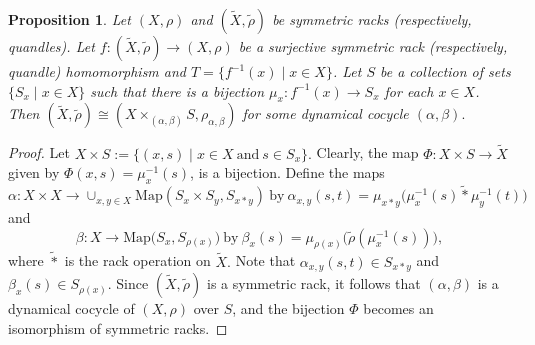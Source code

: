 \documentclass[11pt,reqno]{amsart}
\newtheorem{proposition}[theorem]{Proposition}
\theoremstyle{definition}
\numberwithin{equation}{subsection}
\newcommand{\Map}{\mathrm{Map}}
\begin{document}
\begin{proposition}\label{surjective homomorphism characterisation}
	Let $(X,\rho)$ and $(\tilde{X},\tilde{\rho})$ be symmetric racks (respectively, quandles). Let $f:(\tilde{X},\tilde{\rho}) \rightarrow (X,\rho)$ be a surjective symmetric rack (respectively, quandle) homomorphism and $T=\{f^{-1}(x) \mid x \in X\}$. Let $S$ be a collection of sets $\{ S_x \mid x \in X \}$ such that there is a bijection $\mu_x:f^{-1}(x)  \rightarrow S_x$ for each $x \in X$. Then $(\tilde{X},\tilde{\rho}) \cong (X \times_{(\alpha,\beta)}S, \rho_{\alpha,\beta})$ for some dynamical cocycle $(\alpha,\beta).$ 

\end{proposition}
\begin{proof} Let $X \times S:=\{(x,s)\mid x \in X~\textrm{and}~s \in S_x\}.$ Clearly, the map $\Phi: X \times S \to \tilde{X}$ given by $\Phi(x, s)=\mu_x^{-1}(s)$, is a bijection.  Define the maps
$$ \alpha:X \times X \rightarrow \cup_{x,y \in X}\Map(S_x \times S_y, S_{x*y})~\textrm{by}~ \alpha_{x,y}(s,t) = \mu_{x*y} \big(\mu_x^{-1}(s) \tilde{*}	\mu_y^{-1}(t) \big)$$
and 
$$ \beta:X \rightarrow \Map\big(S_x,S_{\rho(x)}\big)~\textrm{by}~ \beta_x(s)= \mu_{\rho(x)} \big(\tilde{\rho}(\mu_x^{-1}(s))\big),$$
where $\tilde{*}$ is the rack operation on $\tilde{X}.$ Note that $	\alpha_{x,y}(s,t)\in S_{x*y}$ and $\beta_x(s) \in S_{\rho(x)}.$ Since $(\tilde{X},\tilde{\rho})$ is a symmetric rack, it follows that $(\alpha,\beta)$ is a dynamical cocycle of $(X,\rho)$ over $S$, and the bijection $\Phi$ becomes an isomorphism of symmetric racks. 
\end{proof}
\end{document}
